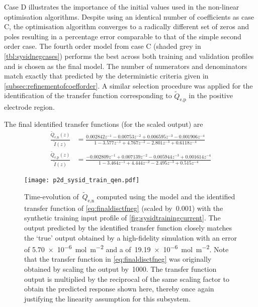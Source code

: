 Case D illustrates  the importance of the initial values  used in the non-linear
optimisation algorithms.  Despite using an  identical number of  coefficients as
case C,  the optimisation algorithm  converges to  a radically different  set of
zeros  and  poles  resulting  in  a  percentage  error  comparable  to  that  of
the  simple second  order  case. The  fourth  order model  from  case C  (shaded
grey  in \cref{tbl:sysidnegcases}) performs  the best  across both  training and
validation profiles and  is chosen as the final model.  The number of numerators
and  denominators match  exactly that  predicted by  the deterministic  criteria
given in \cref{subsec:refinementofcoefforder}. A similar selection procedure was
applied  for  the  identification  of the  transfer  function  corresponding  to
$\widetilde{Q}_{\text{e,p}}$ in the positive electrode region.

The final identified transfer functions (for the scaled output) are
\begin{align}
    \frac{\widetilde{Q}_{\text{e,n}}(z)}{\widetilde{I}(z)} & = \frac{0.002842 z^{-1} - 0.00753 z^{-2} + 0.006595 z^{-3} - 0.001906 z^{-4}}{1 - 3.577 z^{-1} + 4.767 z^{-2} - 2.801 z^{-3} + 0.6118 z^{-4}} \label{eq:finaldisctfneg}\\
    \frac{\widetilde{Q}_{\text{e,p}}(z)}{\widetilde{I}(z)} & = \frac{-0.002809 z^{-1} + 0.007139 z^{-2} - 0.005944 z^{-3} + 0.001614 z^{-4}}{1 - 3.464 z^{-1} + 4.444 z^{-2} - 2.495 z^{-3} + 0.515 z^{-4}}\label{eq:finaldisctfpos}
\end{align}

\begin{figure}[!htbp]
    \centering
    \texttt{[image: p2d\_sysid\_train\_qen.pdf]}
    \caption[$\widetilde{Q}_{\text{e,n}}(t)$ outputs from  and
    identified transfer function for training profile]{%
        Time-evolution of~$\widetilde{Q}_{\text{e,n}}$ computed using the
         model  and the identified transfer function
        of \cref{eq:finaldisctfneg} (scaled by~0.001) with the synthetic
        training input profile of \cref{fig:sysidtrainingcurrent}. The output
        predicted by the identified transfer function closely matches the `true'
        output obtained by a high-fidelity  simulation with an
         error of \SI{5.70e-6}{\mole\per\meter\squared} and a
         of~\SI{19.19e-6}{\mole\per\meter\squared}. Note that the
        transfer function in \cref{eq:finaldisctfneg} was originally obtained by
        scaling the output by~1000. The transfer function output is
        multiplied by the reciprocal of the same scaling factor to obtain the
        predicted response shown here, thereby once again justifying the
        linearity assumption for this subsystem.
    }%
    \label{fig:tfpredQentrain}
\end{figure}

